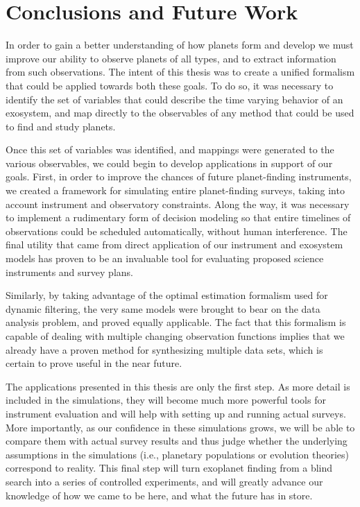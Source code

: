 \chapter{Conclusions and Future Work}\label{ch:conclusions}

In order to gain a better understanding of how planets form and develop we must improve our ability to observe planets of all types, and to extract information from such observations.  The intent of this thesis was to create a unified formalism that could be applied towards both these goals.  To do so, it was necessary to identify the set of variables that could describe the time varying behavior of an exosystem, and map directly to the observables of any method that could be used to find and study planets.

Once this set of variables was identified, and mappings were generated to the various observables, we could begin to develop applications in support of our goals.  First, in order to improve the chances of future planet-finding instruments, we created a framework for simulating entire planet-finding surveys, taking into account instrument and observatory constraints.  Along the way, it was necessary to implement a rudimentary form of decision modeling so that entire timelines of observations could be scheduled automatically, without human interference.  The final utility that came from direct application of our instrument and exosystem models has proven to be an invaluable tool for evaluating proposed science instruments and survey plans.

Similarly,  by taking advantage of the optimal estimation formalism used for dynamic filtering, the very same models were brought to bear on the data analysis problem, and proved equally applicable.  The fact that this formalism is capable of dealing with multiple changing observation functions implies that we already have a proven method for synthesizing multiple data sets, which is certain to prove useful in the near future.

The applications presented in this thesis are only the first step.  As more detail is included in the simulations, they will become much more powerful tools for instrument evaluation and will help with setting up and running actual surveys.  More importantly, as our confidence in these simulations grows, we will be able to compare them with actual survey results and thus judge whether the underlying assumptions in the simulations (i.e., planetary populations or evolution theories) correspond to reality.  This final step will turn exoplanet finding from a blind search into a series of controlled experiments, and will greatly advance our knowledge of how we came to be here, and what the future has in store.